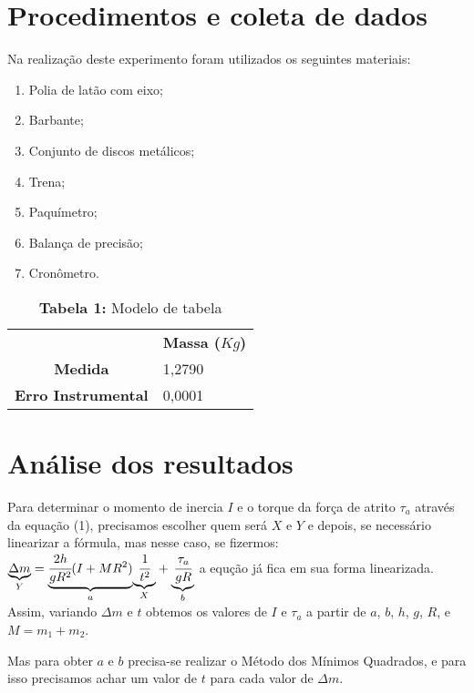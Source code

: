 \documentclass{article}
\begin{document}
\section{Procedimentos e coleta de dados}

Na realização deste experimento foram utilizados os seguintes materiais: 
\begin{enumerate} 
	\item Polia de latão com eixo;
	\item Barbante;
	\item Conjunto de discos metálicos;
	\item Trena;
	\item Paquímetro;
	\item Balança de precisão;
	\item Cronômetro.
 \end {enumerate} 

\begin{table}[!ht]
	\begin{center}
		\caption*{\textbf{Tabela 1:} Modelo de tabela}
		\begin{tabular}{| l | l |}
			\cline{2-2} \multicolumn{0}{c|}{ } & \multicolumn{1}{c|}{\textbf{Massa ($Kg$)}} \\  \cline{1-2}
			\multicolumn{0}{|c|}{\textbf{Medida}} & 1,2790\\ \hline
			\multicolumn{0}{|c|}{\textbf{Erro Instrumental}} & 0,0001\\ \hline
		\end{tabular}
	\end{center}
\end{table}

\section{Análise dos resultados}

Para determinar o momento de inercia $I$ e o torque da força de atrito
$\tau_{a}$ através da equação (1), precisamos escolher quem será
$X$ e $Y$ e depois, se necessário linearizar a fórmula, mas nesse
caso, se fizermos: $\underset{Y}{\underbrace{\Delta m}}=\underset{a}{\underbrace{\cfrac{2h}{gR^{2}}(I+MR^{2})}}\underset{X}{\underbrace{\ensuremath{\cfrac{1}{t^{2}}}}}+\underset{b}{\underbrace{\cfrac{\tau_{a}}{gR}}}$
a equção já fica em sua forma linearizada. Assim, variando $\Delta m$
e $t$ obtemos os valores de $I$ e $\tau_{a}$ a partir de $a$,
$b$, $h$, $g$, $R$, e $M=m_{1}+m_{2}$.

Mas para obter $a$ e $b$ precisa-se realizar o Método dos Mínimos
Quadrados, e para isso precisamos achar um valor de $t$ para cada
valor de $\Delta m$.
\end{document}
